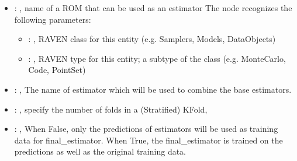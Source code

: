 \begin{itemize}
    \item {}: , 
      name of a ROM that can be used as an estimator
      The  node recognizes the following parameters:
        \begin{itemize}
          \item {}: , 
            RAVEN class for this entity (e.g. Samplers, Models, DataObjects)
          \item {}: , 
            RAVEN type for this entity; a subtype of the class (e.g. MonteCarlo, Code, PointSet)
      \end{itemize}

    \item {}: , 
      The name of estimator which will be used to combine the base estimators.

    \item {}: , 
      specify the number of folds in a (Stratified) KFold,

    \item {}: , 
      When False, only the predictions of estimators will be used as training
      data for final\_estimator. When True, the final\_estimator is trained on the predictions
      as well as the original training data.
  \end{itemize}
